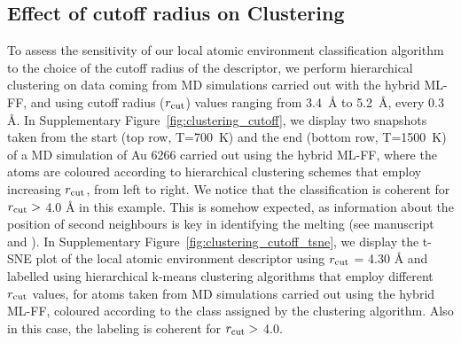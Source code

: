 \documentclass[%
aip,
 amsmath,amssymb,
 reprint,
]{revtex4-1}
\newcommand*\subt[1]{_{\textnormal{#1}}}
\begin{document}
\subsection*{Effect of cutoff radius on Clustering}
%

To assess the sensitivity of our local atomic environment classification algorithm to the choice of the cutoff radius of the descriptor, we perform hierarchical clustering on data coming from MD simulations carried out with the hybrid ML-FF, and using cutoff radius ($r\subt{cut}$) values ranging from 3.4~$\text{\AA}$ to 5.2~$\text{\AA}$, every 0.3~$\text{\AA}$.
%
In Supplementary Figure~\ref{fig:clustering_cutoff}, we display two snapshots taken from the start (top row, T=700~K) and the end (bottom row, T=1500~K) of a MD simulation of Au 6266 carried out using the hybrid ML-FF, where the atoms are coloured according to hierarchical clustering schemes that employ increasing $r\subt{cut}$, from left to right. 
%
We notice that the classification is coherent for $r\subt{cut} >$ 4.0 $\text{\AA}$ in this example.
%
This is somehow expected, as information about the position of second neighbours is key in identifying the melting (see manuscript and  \cite{Delgado-Callico2020}).
%
In Supplementary Figure~\ref{fig:clustering_cutoff_tsne}, we display the t-SNE plot of the local atomic environment descriptor using $r\subt{cut}$ = 4.30 $\text{\AA}$ and labelled using hierarchical k-means clustering algorithms that employ different $r\subt{cut}$ values, for atoms taken from MD simulations carried out using the hybrid ML-FF, coloured according to the class assigned by the clustering algorithm.
%
Also in this case, the labeling is coherent for $r\subt{cut} > $ 4.0.
\end{document}
